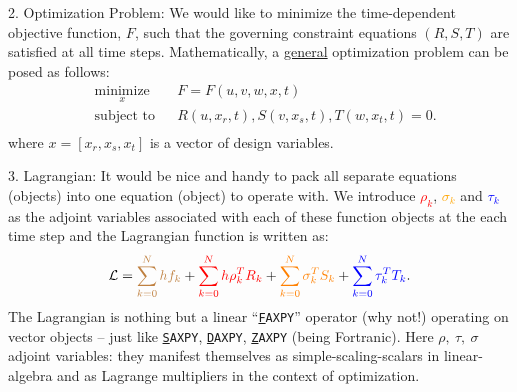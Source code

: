 \documentclass{beamer}
\newenvironment{noheadline}{
    \setbeamertemplate{headline}{}
    \addtobeamertemplate{frametitle}{\vspace*{-1.5\baselineskip}}{}
}{}
\begin{document}
\begin{noheadline}
\begin{frame}[allowframebreaks]
{\begin{block}{2. Optimization Problem:}
  We would like to minimize the time-dependent objective function,
  $F$, such that the governing constraint equations $(R, S, T)$ are
  satisfied at all time steps.  Mathematically, a \underline{general}
  optimization problem can be posed as follows:
  \begin{equation}
    \begin{aligned}
      & \underset{x}{\text{minimize}}
      & & F = F(u, v, w, x,t) \\
      & \text{subject to} & &  R(u, x_r, t), S(v, x_s, t), T(w, x_t, t) = 0.\\
    \end{aligned}
  \end{equation}
  where $x = [x_r, x_s, x_t]$ is a vector of design variables.
\end{block}

\begin{block}{3. Lagrangian:}
  It would be nice and handy to pack all separate equations (objects)
  into one equation (object) to operate with. We introduce
  \textcolor{red}{$\rho_k$}, \textcolor{orange}{$\sigma_k$} and
  \textcolor{blue}{$\tau_k$} as the adjoint variables associated with
  each of these function objects at the each time step and the
  Lagrangian function is written as:
  \begin{equation}\label{eqn:nbg-lagrangian}
    {\cal{L}} = \textcolor{brown}{\sum_{k=0}^N h f_k} + \textcolor{red}{ \sum_{k=0}^N h \rho_k^T R_k} 
    +  \textcolor{orange}{ \sum_{k=0}^N\sigma_k^T S_k} +  \textcolor{blue}{ \sum_{k=0}^N\tau_k^T T_k}.
  \end{equation}
  The Lagrangian is nothing but a linear ``\texttt{\underline{F}AXPY}'' 
  operator  (why not!) operating on vector objects -- just like \texttt{\underline{S}AXPY}, 
  \texttt{\underline{D}AXPY}, \texttt{\underline{Z}AXPY} (being Fortranic).
  Here $\rho,~\tau,~\sigma$ adjoint variables: they
  manifest themselves as simple-scaling-scalars in linear-algebra and
  as Lagrange multipliers in the context of optimization.
\end{block}


\framebreak

}
\end{frame}
\end{noheadline}
\end{document}
